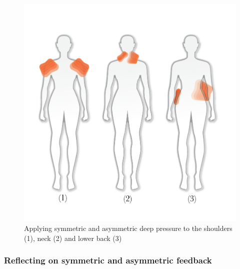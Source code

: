 \begin{figure}[t]
  \centering  
  \includegraphics[width=0.9\linewidth]{Chapters/Figures/soma_chi/fig6_positions_numbers.png}
  \caption{Applying symmetric and asymmetric deep pressure to the shoulders (1), neck (2) and lower back (3)}
    \label{fig:neck}
\end{figure}

\subsubsection{Reflecting on symmetric and asymmetric feedback}

